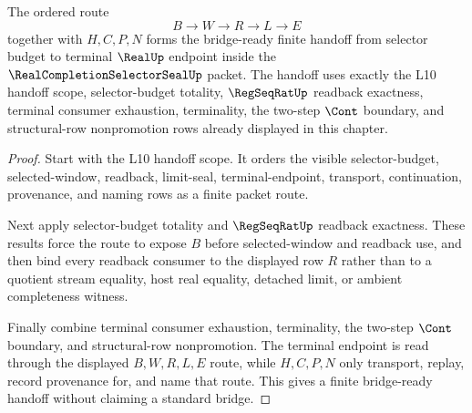 \begin{theorem}
\label{thm:real-completion-selector-seal-bridge-readiness}
The ordered route
$$
B \to W \to R \to L \to E
$$
together with $H,C,P,N$ forms the bridge-ready finite handoff from selector budget to terminal $\RealUp$ endpoint inside the $\RealCompletionSelectorSealUp$ packet. The handoff uses exactly the L10 handoff scope, selector-budget totality, $\RegSeqRatUp$ readback exactness, terminal consumer exhaustion, terminality, the two-step $\Cont$ boundary, and structural-row nonpromotion rows already displayed in this chapter.
\end{theorem}
\begin{proof}
Start with the L10 handoff scope. It orders the visible selector-budget, selected-window, readback, limit-seal, terminal-endpoint, transport, continuation, provenance, and naming rows as a finite packet route.

Next apply selector-budget totality and $\RegSeqRatUp$ readback exactness. These results force the route to expose $B$ before selected-window and readback use, and then bind every readback consumer to the displayed row $R$ rather than to a quotient stream equality, host real equality, detached limit, or ambient completeness witness.

Finally combine terminal consumer exhaustion, terminality, the two-step $\Cont$ boundary, and structural-row nonpromotion. The terminal endpoint is read through the displayed $B,W,R,L,E$ route, while $H,C,P,N$ only transport, replay, record provenance for, and name that route. This gives a finite bridge-ready handoff without claiming a standard bridge.
\end{proof}

